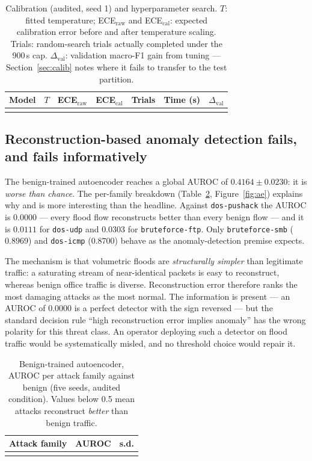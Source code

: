 \documentclass[review,12pt]{elsarticle}
\begin{document}
\begin{table}[t]
\centering
\caption{Calibration (audited, seed 1) and hyperparameter search. $T$: fitted temperature;
ECE$_{\mathrm{raw}}$ and ECE$_{\mathrm{cal}}$: expected calibration error before and after
temperature scaling. Trials: random-search trials actually completed under the 900\,s cap.
$\Delta_{\mathrm{val}}$: validation macro-F1 gain from tuning --- Section~\ref{sec:calib}
notes where it fails to transfer to the test partition.}
\label{tab:calib}
\footnotesize
\setlength{\tabcolsep}{5pt}
\begin{tabular}{lccccrr}
\toprule
Model & $T$ & ECE$_{\mathrm{raw}}$ & ECE$_{\mathrm{cal}}$ & Trials & Time (s) & $\Delta_{\mathrm{val}}$\\
\midrule
\\
\bottomrule
\end{tabular}
\end{table}

\subsection{Reconstruction-based anomaly detection fails, and fails informatively}
\label{sec:autoencoder}
The benign-trained autoencoder reaches a global AUROC of $0.4164 \pm 0.0230$: it is
\emph{worse than chance}. The per-family breakdown (Table~\ref{tab:ae},
Figure~\ref{fig:ae}) explains why and is more interesting than the headline. Against
\texttt{dos-pushack} the AUROC is $0.0000$ --- every flood flow reconstructs better than
every benign flow --- and it is $0.0111$ for \texttt{dos-udp} and $0.0303$ for
\texttt{bruteforce-ftp}. Only \texttt{bruteforce-smb} ($0.8969$) and
\texttt{dos-icmp} ($0.8700$) behave as the anomaly-detection premise expects.

The mechanism is that volumetric floods are \emph{structurally simpler} than legitimate
traffic: a saturating stream of near-identical packets is easy to reconstruct, whereas
benign office traffic is diverse. Reconstruction error therefore ranks the most damaging
attacks as the most normal. The information is present --- an AUROC of $0.0000$ is a
perfect detector with the sign reversed --- but the standard decision rule
``high reconstruction error implies anomaly'' has the wrong polarity for this threat
class. An operator deploying such a detector on flood traffic would be systematically
misled, and no threshold choice would repair it.

\begin{table}[t]
\centering
\caption{Benign-trained autoencoder, AUROC per attack family against benign (five seeds,
audited condition). Values below 0.5 mean attacks reconstruct \emph{better} than benign
traffic.}
\label{tab:ae}
\small
\begin{tabular}{lcc}
\toprule
Attack family & AUROC & s.d.\\
\midrule
\\
\bottomrule
\end{tabular}
\end{table}
\end{document}
